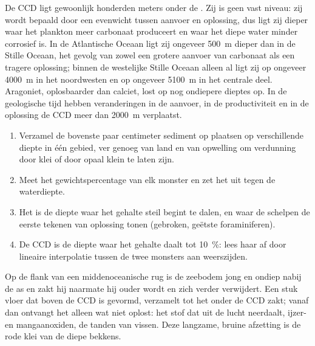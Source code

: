 De CCD ligt gewoonlijk honderden meters onder de . Zij is geen vast niveau: zij wordt bepaald door een evenwicht tussen aanvoer en oplossing, dus ligt zij dieper waar het plankton meer carbonaat produceert en waar het diepe water minder corrosief is. In de Atlantische Oceaan ligt zij ongeveer \qty{500}{m} dieper dan in de Stille Oceaan, het gevolg van zowel een grotere aanvoer van carbonaat als een tragere oplossing; binnen de westelijke Stille Oceaan alleen al ligt zij op ongeveer \qty{4000}{m} in het noordwesten en op ongeveer \qty{5100}{m} in het centrale deel. Aragoniet, oplosbaarder dan calciet, lost op nog ondiepere dieptes op. In de geologische tijd hebben veranderingen in de aanvoer, in de productiviteit en in de oplossing de CCD meer dan \qty{2000}{m} verplaatst.

\begin{method}\label{met:b1:chemical-biogenic-sediments:ccd}
\begin{enumerate}
  \item Verzamel de bovenste paar centimeter sediment op plaatsen op verschillende diepte
        in één gebied, ver genoeg van land en van opwelling om verdunning door
        klei of door opaal klein te laten zijn.
  \item Meet het gewichtspercentage  van elk monster en zet het uit
        tegen de waterdiepte.
  \item Het  is de diepte waar het gehalte steil begint te dalen,
        en waar de schelpen de eerste tekenen van oplossing tonen (gebroken,
        geëtste foraminiferen).
  \item De CCD is de diepte waar het gehalte daalt tot \qty{10}{\%}: lees haar af
        door lineaire interpolatie tussen de twee monsters aan weerszijden.
\end{enumerate}
\end{method}

Op de flank van een middenoceanische rug is de zeebodem jong en ondiep nabij de as en zakt hij naarmate hij ouder wordt en zich verder verwijdert. Een stuk vloer dat boven de CCD is gevormd, verzamelt  tot het onder de CCD zakt; vanaf dan ontvangt het alleen wat niet oplost: het stof dat uit de lucht neerdaalt, ijzer- en mangaanoxiden, de tanden van vissen. Deze langzame, bruine afzetting is de rode klei van de diepe bekkens.

